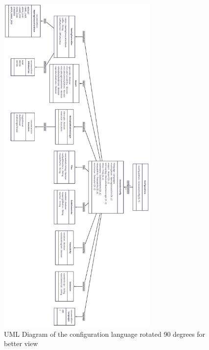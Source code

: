 \begin{figure}[htbp]
\centering
\includegraphics[width=0.7\textwidth]{configLanguageUMLRotated.png}
\caption{UML Diagram of the configuration language rotated 90 degrees for better view}
\label{figapp:configLanguageUMLRotated}
\end{figure}












